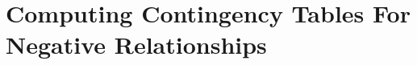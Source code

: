 \documentclass{acm_proc_article-sp}
\begin{document}
\section{Computing Contingency Tables For Negative Relationships} 
\end{document}
